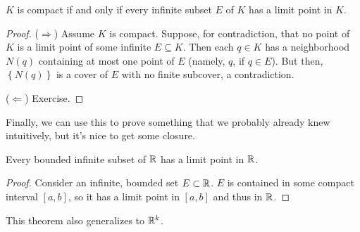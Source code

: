 \documentclass[../m131main.tex]{subfiles}
\begin{document}
\begin{theorem}[]
    $K$ is compact if and only if every infinite subset $E$ of $K$ has a limit point in $K$.
\end{theorem}

\begin{proof}
    ($\Rightarrow$)
    Assume $K$ is compact.
    Suppose, for contradiction, that no point of $K$ is a limit point of some infinite $E \subseteq K$.
    Then each $q \in K$ has a neighborhood $N(q)$ containing at most one point of $E$ (namely, $q$, if $q \in E$).
    But then, $\left\{ N(q) \right\}$ is a cover of $E$ with no finite subcover, a contradiction.

    ($\Leftarrow$) Exercise.
\end{proof}

Finally, we can use this to prove something that we probably already knew intuitively, but it's nice to get some closure.

\begin{corollary}
    Every bounded infinite subset of $\mathbb{R}$ has a limit point in $\mathbb{R}$.
\end{corollary}

\begin{proof}
    Consider an infinite, bounded set $E \subset \mathbb{R}$.
    $E$ is contained in some compact interval $[a,b]$, so it has a limit point in $[a,b]$ and thus in $\mathbb{R}$.
\end{proof}

This theorem also generalizes to $\mathbb{R}^k$.

\end{document}
